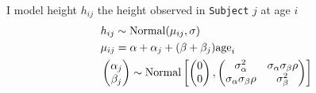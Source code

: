\documentclass{article}
\begin{document}
I model height $h_{ij}$ the height observed in {\tt Subject} $j$ at age $i$
\begin{align*}
&h_{ij} \sim {\rm Normal}(\mu_{ij}, \sigma)\\
&\mu_{ij} = \alpha + \alpha_j + (\beta + \beta_j){\rm age}_i\\
&\left( \begin{matrix}\alpha_j\\ \beta_j\end{matrix}\right) \sim {\rm Normal}
\left [ \left( \begin{matrix}0\\ 0\end{matrix}\right), \left( \begin{matrix}\sigma^2_\alpha & \sigma_\alpha \sigma_\beta \rho\\ \sigma_\alpha \sigma_\beta \rho &\sigma^2_\beta\end{matrix}\right)\right]
\end{align*}
\end{document}
